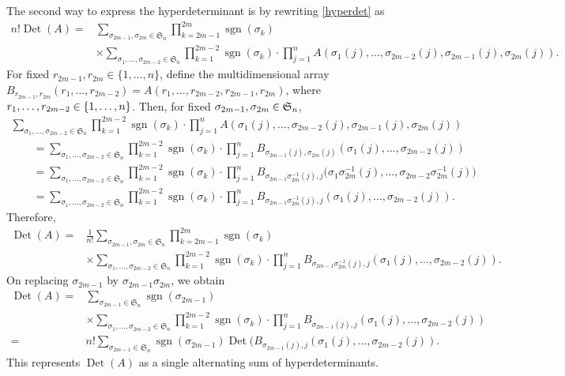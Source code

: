 \documentclass[pdftex]{sigma}
\numberwithin{equation}{section}
\def\sgn{\operatorname{sgn}}
\def\Det{\operatorname{Det}}
\def\frS{\mathfrak{S}}
\begin{document}
The second way to express the hyperdeterminant is by rewriting \eqref{hyperdet} as
\begin{align*}
n! \Det(A)={}& \sum_{\sigma_{2m-1},\sigma_{2m} \in \frS_n} \prod_{k=2m-1}^{2m} \sgn(\sigma_k) \\
& \times \sum_{\sigma_1,\dots,\sigma_{2m-2} \in \frS_n} \prod_{k=1}^{2m-2} \sgn(\sigma_k) \cdot \prod_{j=1}^n A(\sigma_1(j),\dots,\sigma_{2m-2}(j),\sigma_{2m-1}(j),\sigma_{2m}(j)).
\end{align*}
For fixed $r_{2m-1},r_{2m} \in \{1,\dots,n\}$, define the multidimensional array
$
B_{r_{2m-1},r_{2m}}(r_1,\dots,r_{2m-2}) = A(r_1,\dots,r_{2m-2},r_{2m-1},r_{2m})
$,
where $r_1,\dots,r_{2m-2} \hspace{-0.15pt}\in\hspace{-0.15pt} \{1,\dots,n\}$. Then, for fixed ${\sigma_{2m-1},\sigma_{2m}\hspace{-0.15pt} \in\hspace{-0.15pt} \frS_n}$,
\begin{gather*}
 \sum_{\sigma_1,\dots,\sigma_{2m-2} \in \frS_n} \prod_{k=1}^{2m-2} \sgn(\sigma_k) \cdot \prod_{j=1}^n A(\sigma_1(j),\dots,\sigma_{2m-2}(j),\sigma_{2m-1}(j),\sigma_{2m}(j)) \\
\qquad= \sum_{\sigma_1,\dots,\sigma_{2m-2} \in \frS_n} \prod_{k=1}^{2m-2} \sgn(\sigma_k) \cdot \prod_{j=1}^n B_{\sigma_{2m-1}(j),\sigma_{2m}(j)}(\sigma_1(j),\dots,\sigma_{2m-2}(j)) \\
\qquad= \sum_{\sigma_1,\dots,\sigma_{2m-2} \in \frS_n} \prod_{k=1}^{2m-2} \sgn(\sigma_k) \cdot \prod_{j=1}^n B_{\sigma_{2m-1}\sigma_{2m}^{-1}(j),j}\bigl(\sigma_1\sigma_{2m}^{-1}(j),\dots,\sigma_{2m-2}\sigma_{2m}^{-1}(j)\bigr) \\
\qquad= \sum_{\sigma_1,\dots,\sigma_{2m-2} \in \frS_n} \prod_{k=1}^{2m-2} \sgn(\sigma_k) \cdot \prod_{j=1}^n B_{\sigma_{2m-1}\sigma_{2m}^{-1}(j),j}(\sigma_1(j),\dots,\sigma_{2m-2}(j)).
\end{gather*}
Therefore,
\begin{align*}
\Det(A) ={} & \frac{1}{n!} \sum_{\sigma_{2m-1},\sigma_{2m} \in \frS_n} \prod_{k=2m-1}^{2m} \sgn(\sigma_k) \\
& \times \sum_{\sigma_1,\dots,\sigma_{2m-2} \in \frS_n} \prod_{k=1}^{2m-2} \sgn(\sigma_k) \cdot \prod_{j=1}^n B_{\sigma_{2m-1}\sigma_{2m}^{-1}(j),j}(\sigma_1(j),\dots,\sigma_{2m-2}(j)).
\end{align*}
On replacing $\sigma_{2m-1}$ by $\sigma_{2m-1}\sigma_{2m}$, we obtain
\begin{align}
\Det(A) ={} & \sum_{\sigma_{2m-1} \in \frS_n} \sgn(\sigma_{2m-1}) \nonumber \\
& \times \sum_{\sigma_1,\dots,\sigma_{2m-2} \in \frS_n} \prod_{k=1}^{2m-2} \sgn(\sigma_k) \cdot \prod_{j=1}^n B_{\sigma_{2m-1}(j),j}(\sigma_1(j),\dots,\sigma_{2m-2}(j)) \nonumber \\
= {}& n! \sum_{\sigma_{2m-1} \in \frS_n} \sgn(\sigma_{2m-1})
\Det(B_{\sigma_{2m-1}(j),j}(\sigma_1(j),\dots,\sigma_{2m-2}(j)).\label{recurrence_hyperdet}
\end{align}
This represents $\Det(A)$ as a single alternating sum of hyperdeterminants.
\end{document}

